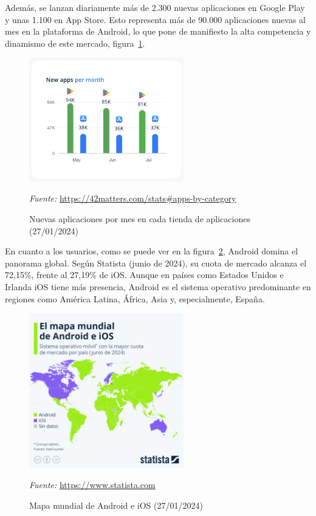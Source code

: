 Además, se lanzan diariamente más de 2.300 nuevas aplicaciones en Google Play y unas 1.100 en App Store. Esto representa más de 90.000 aplicaciones nuevas al mes en la plataforma de Android, lo que pone de manifiesto la alta competencia y dinamismo de este mercado, figura~\ref{fig:apps_per_month}.

\begin{figure}[H]
\centering
\includegraphics[width=0.6\textwidth]{./img/intro/apps_per_month.png}
\caption{Nuevas aplicaciones por mes en cada tienda de aplicaciones (27/01/2024)}
\label{fig:apps_per_month}
\vspace{0.2em}
{\footnotesize \centering \textit{Fuente:} \url{https://42matters.com/stats#apps-by-category} \par}
\end{figure}

En cuanto a los usuarios, como se puede ver en la figura~\ref{fig:world_map_ios_android}, Android domina el panorama global. Según Statista (junio de 2024), su cuota de mercado alcanza el 72,15\%, frente al 27,19\% de iOS. Aunque en países como Estados Unidos e Irlanda iOS tiene más presencia, Android es el sistema operativo predominante en regiones como América Latina, África, Asia y, especialmente, España.

\begin{figure}[H]
\centering
\includegraphics[width=0.6\textwidth]{./img/intro/world_map_ios_android.jpeg}
\caption{Mapa mundial de Android e iOS (27/01/2024)}
\label{fig:world_map_ios_android}
\vspace{0.2em}
{\footnotesize \centering \textit{Fuente:} \url{https://www.statista.com} \par}
\end{figure}

